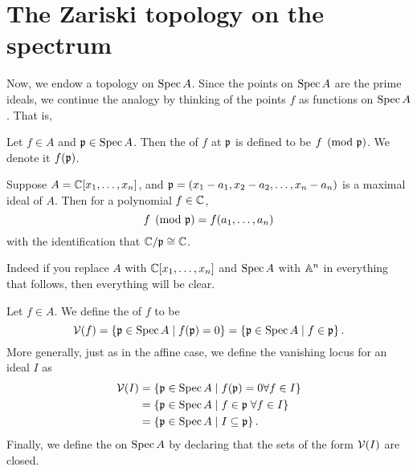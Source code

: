 \section{The Zariski topology on the spectrum}

Now, we endow a topology on $\operatorname{Spec} A$.
Since the points on $\operatorname{Spec} A$ are the prime ideals, we continue
the analogy by thinking of the points $f$ as functions on $\operatorname{Spec} A$. That is,
\begin{definition}
	Let $f \in A$ and $\mathfrak p \in \operatorname{Spec} A$.
	Then the  of $f$ at $\mathfrak p$ is defined to be $f \pmod{\mathfrak p}$.
	We denote it $f(\mathfrak p)$.
\end{definition}
\begin{example}
	Suppose $A = \mathbb C[x_1, \dots, x_n]$,
	and $\mathfrak p = (x_1-a_1, x_2-a_2, \dots, x_n-a_n)$ is a maximal ideal of $A$.
	Then for a polynomial $f \in \mathbb C$,
	\[ f \pmod {\mathfrak p} = f(a_1, \dots, a_n) \]
	with the identification that $\mathbb C/\mathfrak p \cong \mathbb C$.
\end{example}
Indeed if you replace $A$ with $\mathbb C[x_1, \dots, x_n]$
and $\operatorname{Spec} A$ with $\mathbb A^n$ in everything that follows,
then everything will be clear.

\begin{definition}
	Let $f \in A$. We define the  of $f$ to be
	\[ \mathcal V(f) = \left\{ \mathfrak p \in \operatorname{Spec} A \mid f(\mathfrak p) = 0 \right\}
		= \left\{ \mathfrak p \in \operatorname{Spec} A \mid f \in \mathfrak p \right\}. \]
	More generally, just as in the affine case,
	we define the vanishing locus for an ideal $I$ as
	\begin{align*}
		\mathcal V(I) &= \left\{ \mathfrak p \in \operatorname{Spec} A \mid f(\mathfrak p)=0 \forall f \in I \right\} \\
		&= \left\{ \mathfrak p \in \operatorname{Spec} A \mid f \in \mathfrak p \; \forall f \in I \right\} \\
		&= \left\{ \mathfrak p \in \operatorname{Spec} A \mid I \subseteq \mathfrak p \right\}.
	\end{align*}
	Finally, we define the  on $\operatorname{Spec} A$
	by declaring that the sets of the form $\mathcal V(I)$ are closed.
\end{definition}


